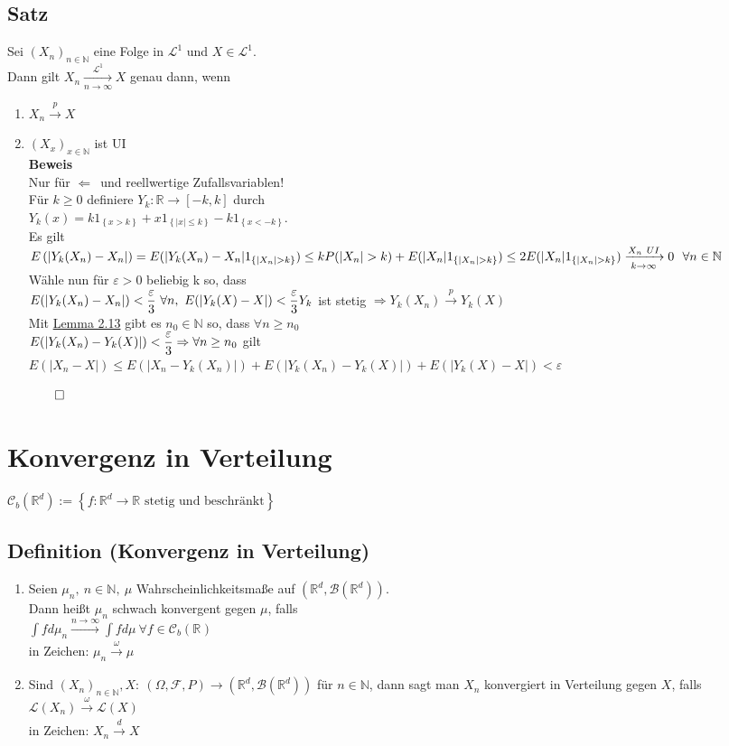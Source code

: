 \documentclass[german,10pt,oneside, fleqn, a4paper]{article}
\newcommand {\R}	{\mathbb{R}}
\newcommand {\N}	{\mathbb{N}}
\newcommand{\Ra}	{\Rightarrow}
\newcommand{\La}	{\Leftarrow}
\newcommand{\brc}[1]{\left(#1\right)}
\newcommand{\brac}[1]{\left\lbrace #1\right\rbrace}
\newcommand{\folge}[3][\N]{\left(#2_#3\right)_{#3\in #1}}
\newcommand{\QED}{\begin{flushright}$\qed$\end{flushright}}
\newcommand{\mc}[1]{\mathcal{#1}}
\newcommand{\lp}[1]{\mc{L}^{#1}}
\newcommand{\la}{\lp{1}}
\newcommand{\beweis}{\textbf{Beweis}\\}
\newcommand{\toinf}{\rightarrow\infty}
\newcommand{\fn}[1][n]{\ \forall #1\in\N}
\newcommand{\1}[1]{1_{#1}}
\newcommand{\2}[1]{\1{\brac{#1}}}
\newcommand{\xr}[2][]{\xrightarrow[#1]{#2}}
\newcommand{\cb}[1][d]{\mc{C}_b\brc{\R^{#1}}}
\newcommand{\rbor}[1][d]{\brc{\R^{#1},\mc{B}\brc{\R^{#1}}}}
\newcommand{\raum}{\brc{\Omega,\mc{F},P}}
\begin{document}
\subsection{Satz}
Sei $\folge{X}{n}$ eine Folge in $\la$ und $X\in\la$. \\
Dann gilt $X_n\xrightarrow[n\toinf]{\la}X$ genau dann, wenn
\begin{enumerate}[label=(\roman*)]
\item $X_n\xrightarrow {p}X$
\item $\folge{X}{x}$ ist UI\\
\beweis
Nur für \glqq$\La$\grqq\ und reellwertige Zufallsvariablen!\\
Für $k\geq 0$ definiere $Y_k:\R\rightarrow\left[ -k,k\right]$ durch\\ $Y_k(x)=k\1{\brac{x>k}}+x\1{\brac{|x|\leq k}}-k\1{\brac{x<-k}}$.\\
Es gilt \\
$E\brc{|Y_k(X_n)-X_n|}=E(|Y_k(X_n)-X_n|\1{\brac{|X_n|>k}})\\
\leq kP(|X_n|>k)+E(|X_n|\1{\brac{|X_n|>k}})\\
\leq 2E(|X_n|\1{\brac{|X_n|>k}})\xrightarrow[k\toinf]{X_n\ UI}0\ \fn$\\
Wähle nun für $\varepsilon>0$ beliebig k so, dass\\
$E(|Y_k(X_n)-X_n|)<\dfrac{\varepsilon}{3}\ \forall n,\ E(|Y_k(X)-X|)<\dfrac{\varepsilon}{3}\\
Y_k$ ist stetig $\Ra Y_k(X_n)\xr{p}Y_k(X)$\\
Mit \hyperref[2.13]{Lemma 2.13} gibt es $n_0\in\N$ so, dass $\forall n\geq  n_0$ \\
$E(|Y_k(X_n)-Y_k(X)|)<\dfrac{\varepsilon}{3}\\
\Ra \forall n\geq n_0$ gilt $E(|X_n-X|)\leq E(|X_n-Y_k(X_n)|)+E(|Y_k(X_n)-Y_k(X)|)+E(|Y_k(X)-X|)<\varepsilon$\QED
\end{enumerate}






\pagebreak
\section{Konvergenz in Verteilung}
$\cb:=\brac{f:\R ^d\rightarrow \R \text{ stetig und beschränkt}}$
\subsection{Definition (Konvergenz in Verteilung)}
\begin{enumerate}[label=(\alph*)]
\item Seien $\mu_n,\ n\in\N,\ \mu$ Wahrscheinlichkeitsmaße auf $\rbor$. \\
Dann heißt $\mu_n$ schwach konvergent gegen $\mu$, falls\\
$\int f d\mu_n\xr{n\toinf}\int fd\mu\ \forall f\in\cb[]$\\
in Zeichen: $\mu_n\xr{\omega}\mu$
\item Sind $\folge{X}{n}, X:\ \raum\rightarrow\rbor$ für $n\in\N$, dann sagt man $X_n$ konvergiert in Verteilung gegen $X$, falls $\mc{L}(X_n)\xr{\omega}\mc{L}(X)$\\
in Zeichen: $X_n\xr{d}X$
\end{enumerate}
\end{document}
